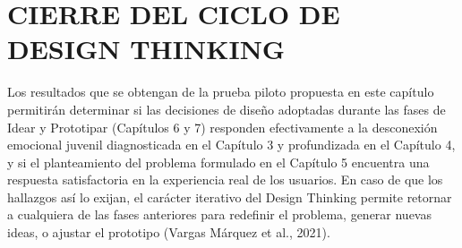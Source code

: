 \section{CIERRE DEL CICLO DE DESIGN THINKING}
Los resultados que se obtengan de la prueba piloto propuesta en este capítulo permitirán determinar si las decisiones de diseño adoptadas durante las fases de Idear y Prototipar (Capítulos 6 y 7) responden efectivamente a la desconexión emocional juvenil diagnosticada en el Capítulo 3 y profundizada en el Capítulo 4, y si el planteamiento del problema formulado en el Capítulo 5 encuentra una respuesta satisfactoria en la experiencia real de los usuarios. En caso de que los hallazgos así lo exijan, el carácter iterativo del Design Thinking permite retornar a cualquiera de las fases anteriores para redefinir el problema, generar nuevas ideas, o ajustar el prototipo (Vargas Márquez et al., 2021).